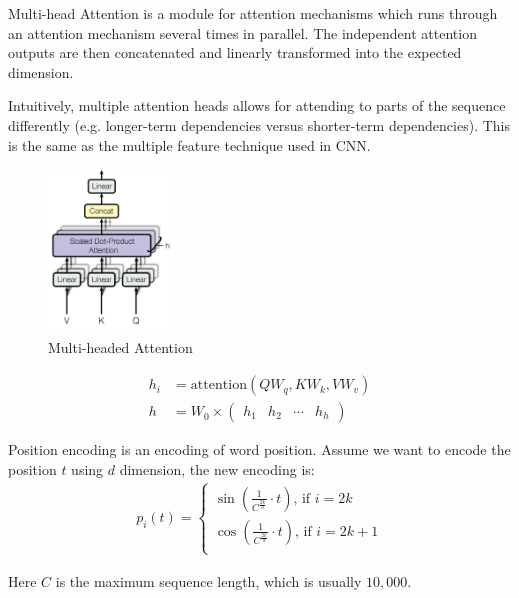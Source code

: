 \begin{definition}
    Multi-head Attention is a module for attention mechanisms which runs through an attention mechanism several times in parallel. The independent attention outputs are then concatenated and linearly transformed into the expected dimension.
    
    Intuitively, multiple attention heads allows for attending to parts of the sequence differently (e.g. longer-term dependencies versus shorter-term dependencies). This is the same as the multiple feature technique used in CNN.

\begin{figure}[H]
\includegraphics[width=0.3\textwidth]{pic/04/multi-headed-attention.png}
\centering
\caption{Multi-headed Attention}
\end{figure}
\end{definition}

\begin{equation}
    \begin{aligned}
        h_i &= \mathrm{attention}(Q W_q, K W_k, V W_v ) \\
        h &= W_0 \times \begin{pmatrix}
            h_1 & h_2 & \cdots & h_h
        \end{pmatrix}
    \end{aligned}
\end{equation}


\begin{definition}
    Position encoding is an encoding of word position. Assume we want to encode the position $t$ using $d$ dimension, the new encoding is:
    \begin{equation}
        \begin{aligned}
            p_i (t) = \begin{cases}
            \displaystyle \sin\left(\frac{1}{C^{\frac{2k}{d}}} \cdot t \right)  \textrm{, if }  i = 2k \\
            \displaystyle \cos\left(\frac{1}{C^{\frac{2k}{d}}} \cdot t \right)  \textrm{, if }  i = 2k +1 \\
            \end{cases}
        \end{aligned}        
    \end{equation}
    
    Here $C$ is the maximum sequence length, which is usually $10,000$.
\end{definition}



